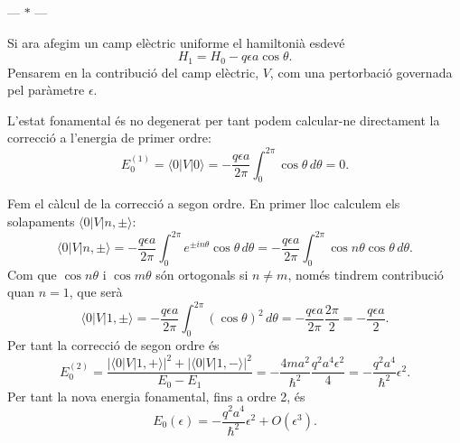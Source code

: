\documentclass[12pt]{article}
\numberwithin{table}{section}
\numberwithin{figure}{section}
\newcommand{\abs}[1]{\lvert #1 \rvert}
\newcommand{\ket}[1]{\vert {#1} \rangle}
\newcommand{\bra}[1]{\langle #1 \vert}
\newcommand{\parbreak}{
	\begin{center}
		--- $\ast$ ---
	\end{center} 
}
\begin{document}
\parbreak

Si ara afegim un camp elèctric uniforme el hamiltonià esdevé
\begin{equation*}
	H_1 = H_0 - q\epsilon a \cos{\theta}.
\end{equation*}
Pensarem en la contribució del camp elèctric, \( V \), com una pertorbació governada pel paràmetre \( \epsilon \).

L'estat fonamental és no degenerat per tant podem calcular-ne directament la correcció a l'energia de primer ordre:
\begin{equation}\label{eq:correccio energia fonamental}
	E_0^{(1)} = \bra{0}V \ket{0} = -\frac{q\epsilon a}{2\pi} \int_0^{2\pi} \cos{\theta} \, d\theta	= 0.
\end{equation}

Fem el càlcul de la correcció a segon ordre. En primer lloc calculem els solapaments \( \bra{0}V \ket{n, \pm} \):
\begin{equation*}
	\bra{0}V\ket{n,\pm} = -\frac{q\epsilon a}{2\pi} \int_0^{2\pi} e^{\pm in\theta} \cos{\theta} \,d\theta = - \frac{q\epsilon a}{2\pi} \int_0^{2\pi} \cos{n\theta} \cos{\theta} \,d\theta.
\end{equation*}
Com que \( \cos{n\theta} \) i \( \cos{m\theta} \) són ortogonals si \( n \neq m \), només tindrem contribució quan \( n = 1 \), que serà
\begin{equation}\label{eq:overlap fonamental}
	\bra{0}V\ket{1,\pm} = - \frac{q\epsilon a}{2\pi} \int_0^{2\pi} (\cos{\theta})^2 \,d\theta = - \frac{q\epsilon a}{2\pi}\frac{2\pi}{2} = - \frac{q \epsilon a}{2}.
\end{equation}
Per tant la correcció de segon ordre és
\begin{equation*}
	E_0^{(2)} = \frac{\abs{\bra{0}V \ket{1, +}}^2 + \abs{\bra{0}V \ket{1, -}}^2}{E_0 - E_1} = -\frac{4ma^2}{\hbar^2} \frac{q^2a^4\epsilon^2}{4} = - \frac{q^2a^4}{\hbar^2}\epsilon^2.
\end{equation*}
Per tant la nova energia fonamental, fins a ordre 2, és
\begin{equation*}
	E_0(\epsilon) = -\frac{q^2a^4}{\hbar^2}\epsilon^2 + O(\epsilon^3).
\end{equation*}
\end{document}
